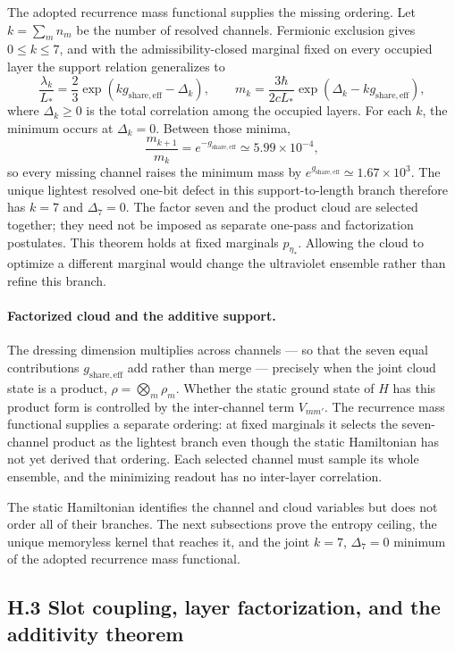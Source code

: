 \documentclass[11pt]{article}
\begin{document}
The adopted recurrence mass functional supplies the missing ordering. Let $k=\sum_m n_m$ be the number of resolved channels. Fermionic exclusion gives $0\le k\le7$, and with the admissibility-closed marginal fixed on every occupied layer the support relation generalizes to
\[
\frac{\lambda_k}{L_*}=\frac23\exp\!\left(kg_{\mathrm{share,eff}}-\Delta_k\right),
\qquad
m_k=\frac{3\hbar}{2cL_*}\exp\!\left(\Delta_k-kg_{\mathrm{share,eff}}\right),
\]
where $\Delta_k\ge0$ is the total correlation among the occupied layers. For each $k$, the minimum occurs at $\Delta_k=0$. Between those minima,
\[
\frac{m_{k+1}}{m_k}=e^{-g_{\mathrm{share,eff}}}\simeq5.99\times10^{-4},
\]
so every missing channel raises the minimum mass by $e^{g_{\mathrm{share,eff}}}\simeq1.67\times10^3$. The unique lightest resolved one-bit defect in this support-to-length branch therefore has $k=7$ and $\Delta_7=0$. The factor seven and the product cloud are selected together; they need not be imposed as separate one-pass and factorization postulates. This theorem holds at fixed marginals $p_{\eta_*}$. Allowing the cloud to optimize a different marginal would change the ultraviolet ensemble rather than refine this branch.

\paragraph{Factorized cloud and the additive support.}
The dressing dimension multiplies across channels --- so that the seven equal contributions $g_{\mathrm{share,eff}}$ add rather than merge --- precisely when the joint cloud state is a product, $\rho=\bigotimes_m\rho_m$. Whether the static ground state of $H$ has this product form is controlled by the inter-channel term $V_{mm'}$. The recurrence mass functional supplies a separate ordering: at fixed marginals it selects the seven-channel product as the lightest branch even though the static Hamiltonian has not yet derived that ordering. Each selected channel must sample its whole ensemble, and the minimizing readout has no inter-layer correlation.

The static Hamiltonian identifies the channel and cloud variables but does not order all of their branches. The next subsections prove the entropy ceiling, the unique memoryless kernel that reaches it, and the joint $k=7$, $\Delta_7=0$ minimum of the adopted recurrence mass functional.

\subsection*{H.3 Slot coupling, layer factorization, and the additivity theorem}
\end{document}
